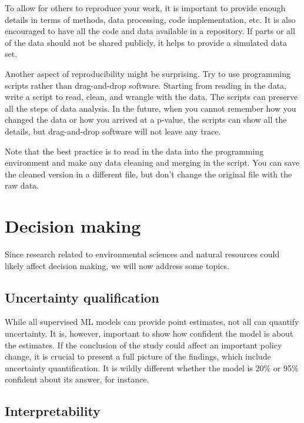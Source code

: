 \documentclass[
]{book}
\begin{document}
To allow for others to reproduce your work, it is important to provide enough details in terms of methods, data processing, code implementation, etc. It is also encouraged to have all the code and data available in a repository. If parts or all of the data should not be shared publicly, it helps to provide a simulated data set.

Another aspect of reproducibility might be surprising. Try to use programming scripts rather than drag-and-drop software. Starting from reading in the data, write a script to read, clean, and wrangle with the data. The scripts can preserve all the steps of data analysis. In the future, when you cannot remember how you changed the data or how you arrived at a p-value, the scripts can show all the details, but drag-and-drop software will not leave any trace.

Note that the best practice is to read in the data into the programming environment and make any data cleaning and merging in the script. You can save the cleaned version in a different file, but don't change the original file with the raw data.

\hypertarget{decision-making}{%
\section{Decision making}\label{decision-making}}

Since research related to environmental sciences and natural resources could likely affect decision making, we will now address some topics.

\hypertarget{uncertainty-qualification}{%
\subsection{Uncertainty qualification}\label{uncertainty-qualification}}

While all supervised ML models can provide point estimates, not all can quantify uncertainty. It is, however, important to show how confident the model is about the estimates. If the conclusion of the study could affect an important policy change, it is crucial to present a full picture of the findings, which include uncertainty quantification. It is wildly different whether the model is 20\% or 95\% confident about its answer, for instance.

\hypertarget{interpretability}{%
\subsection{Interpretability}\label{interpretability}}
\end{document}
